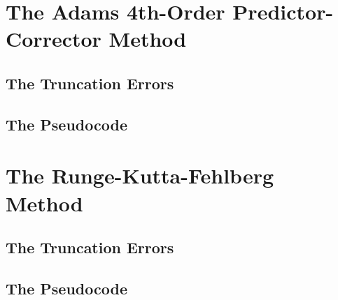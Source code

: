 \documentclass[12pt,oneside]{book}
\begin{document}
		\clearpage
	\section{The Adams 4th-Order Predictor-Corrector Method} \label{m:ab4pc}
		\begin{spacing}{1.2}
			
			
			
			\subsection*{The Truncation Errors}
			
			
			\subsection{The Pseudocode}
			
		\end{spacing}
		
		\clearpage
	\section{The Runge-Kutta-Fehlberg Method} \label{m:rkf}
		\begin{spacing}{1.2}
			
			
			
			\subsection*{The Truncation Errors}
			
			
			\subsection{The Pseudocode}
			
		\end{spacing}
		
		\clearpage
\end{document}
